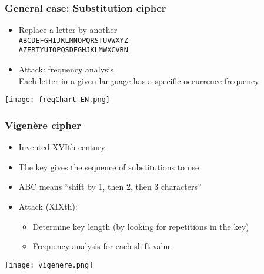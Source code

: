 \documentclass[
hyperref={pdfpagelabels=false}
,xcolor=table
]
{beamer}
\begin{document}
\begin{frame}[fragile]
  \frametitle{General case: Substitution cipher}

  \begin{itemize}
  \item Replace a letter by another\\
    \verb+ABCDEFGHIJKLMNOPQRSTUVWXYZ+\\
    \verb+AZERTYUIOPQSDFGHJKLMWXCVBN+    
  \item Attack: frequency analysis\\
    Each letter in a given language has a specific occurrence frequency
  \end{itemize}

  \begin{center}
    \texttt{[image: freqChart-EN.png]}
  \end{center}
  
\end{frame}


\begin{frame}
  \frametitle{Vigenère cipher}

  \begin{itemize}
  \item Invented XVIth century
  \item The key gives the sequence of substitutions to use
  \item ABC means ``shift by 1, then 2, then 3 characters''
  \item Attack (XIXth):
    \begin{itemize}
    \item Determine key length (by looking for repetitions in the key)
    \item Frequency analysis for each shift value
    \end{itemize}
  \end{itemize}
  
  \begin{center}
    \texttt{[image: vigenere.png]}
  \end{center}
  
\end{frame}
\end{document}
